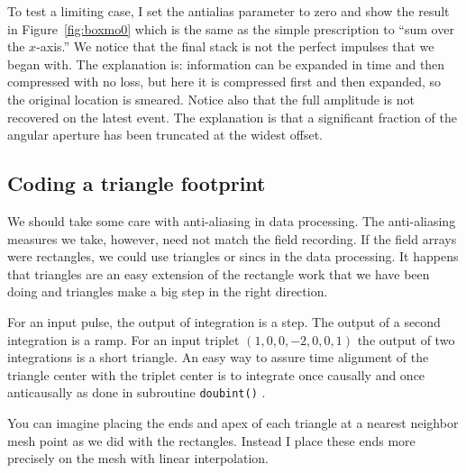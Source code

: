 \par
To test a limiting case,
I set the antialias parameter to zero
and show the result in Figure~\ref{fig:boxmo0}
which is the same as the simple prescription to ``sum over the $x$-axis.''
We notice that the final stack is not the perfect impulses that we began with.
The explanation is:
information can be expanded in time and then compressed with no loss,
but here it is compressed first and then expanded,
so the original location is smeared.
Notice also that
the full amplitude is not recovered on the latest event.
The explanation is that a significant fraction of the angular
aperture has been truncated at the widest offset.


\subsection{Coding a triangle footprint}
\par
We should take some care with anti-aliasing in data processing.
The anti-aliasing measures we take, however,
need not match the field recording.
If the field arrays were rectangles,
we could use triangles or sincs in the data processing.
It happens that triangles are an easy extension
of the rectangle work that we have been doing
and triangles make a big step in the right direction.

\par
For an input pulse,
the output of integration is a step.
The output of a second integration is a ramp.
For an input triplet $(1, 0, 0, -2, 0, 0, 1)$
the output of two integrations is a short triangle.
An easy way to assure time alignment
of the triangle center with
the triplet center is to integrate
once causally and once anticausally
as done in subroutine \texttt{doubint()} .

\par
You can imagine placing the ends and apex of each triangle
at a nearest neighbor mesh point as we did with the rectangles.
Instead I place these ends more precisely on the mesh with
linear interpolation.

\begin{comment}
Subroutine \texttt{lint1()} \vpageref{lst:lint1} does linear interpolation,
but here we need weighted results
as provided by \texttt{spotw()} \vpageref{lst:spotw}.
\progdex{spotw}{weighted linear interp.}

\par
Using these subroutines,
I assembled the stacking subroutine {\tt tristack()}
and the NMO routine {\tt trimo()} with triangle wavelets.
\end{comment}

